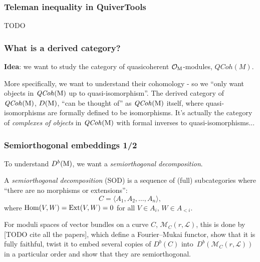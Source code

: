 \documentclass{beamer}
\begin{document}
\begin{frame}
    \frametitle{Teleman inequality in QuiverTools}
TODO
\end{frame}


\begin{frame}
    \frametitle{What is a derived category?}
\textbf{Idea}: we want to study the category of
quasicoherent $\mathcal{O}_{\operatorname{M}}$-modules, $\mathit{QCoh}(M)$.

More specifically, we want to understand their cohomology -
so we ``only want objects in $\mathit{QCoh}(\operatorname{M})$ up to quasi-isomorphism''. \pause
\vfill
The derived category of $\mathit{QCoh}(\operatorname{M})$, $D(\operatorname{M})$,
``can be thought of'' as $\mathit{QCoh}(\operatorname{M})$ itself, where quasi-isomorphisms are
formally defined to be isomorphisms. \pause
\vfill
\small{It's actually the category of \emph{complexes of objects} in $\mathit{QCoh}(\operatorname{M})$
with formal inverses to quasi-isomorphisms...}

\end{frame}
\begin{frame}
    \frametitle{Semiorthogonal embeddings 1/2}
To understand $D^b(\operatorname{M})$, we want a \emph{semiorthogonal decomposition}.

\begin{definition}
A \emph{semiorthogonal decomposition} (SOD) is a sequence of (full) subcategories
where ``there are no morphisms or extensions'':
\[
   \mathit{C} = \langle A_1, A_2, \dots, A_n \rangle,
\]
where $\operatorname{Hom}(V, W) = \operatorname{Ext}(V, W) = 0$ for all $V \in A_i$, $W \in A_{< i}$.
\end{definition}\pause

For moduli spaces of vector bundles on a curve $C$,
$\mathcal{M}_{C}(r, \mathcal{L})$, this is done by
[TODO cite all the papers], which define a Fourier--Mukai functor, show that it is
fully faithful, twist it to embed several copies of $D^b(C)$
into~$D^b(\mathcal{M}_{C}(r, \mathcal{L}))$ in a particular order and show
that they are semiorthogonal.

\end{frame}
\end{document}
